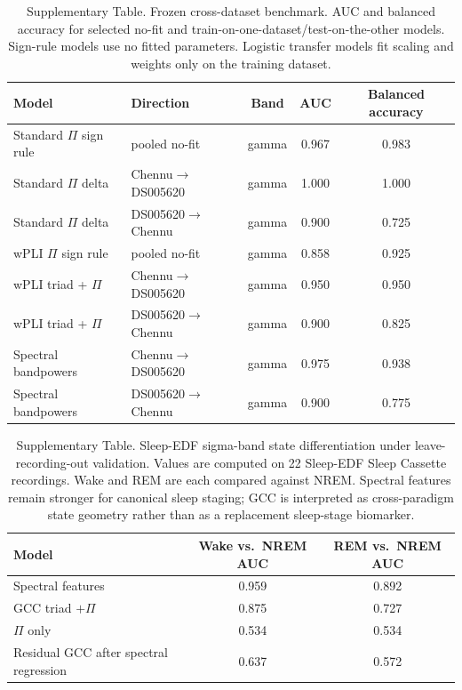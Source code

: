 \documentclass[11pt]{article}
\begin{document}
\begin{table}[h]
\centering
\caption{Supplementary Table. Frozen cross-dataset benchmark. AUC and balanced accuracy for selected no-fit and train-on-one-dataset/test-on-the-other models. Sign-rule models use no fitted parameters. Logistic transfer models fit scaling and weights only on the training dataset.}
\label{tab:frozen-transfer}
\small
\begin{tabular}{llccc}
\toprule
Model & Direction & Band & AUC & Balanced accuracy \\
\midrule
Standard $\Pi$ sign rule & pooled no-fit & gamma & 0.967 & 0.983 \\
Standard $\Pi$ delta & Chennu$\to$DS005620 & gamma & 1.000 & 1.000 \\
Standard $\Pi$ delta & DS005620$\to$Chennu & gamma & 0.900 & 0.725 \\
wPLI $\Pi$ sign rule & pooled no-fit & gamma & 0.858 & 0.925 \\
wPLI triad + $\Pi$ & Chennu$\to$DS005620 & gamma & 0.950 & 0.950 \\
wPLI triad + $\Pi$ & DS005620$\to$Chennu & gamma & 0.900 & 0.825 \\
Spectral bandpowers & Chennu$\to$DS005620 & gamma & 0.975 & 0.938 \\
Spectral bandpowers & DS005620$\to$Chennu & gamma & 0.900 & 0.775 \\
\bottomrule
\end{tabular}
\end{table}

\begin{table}[h]
\centering
\caption{Supplementary Table. Sleep-EDF sigma-band state differentiation under leave-recording-out validation. Values are computed on 22 Sleep-EDF Sleep Cassette recordings. Wake and REM are each compared against NREM. Spectral features remain stronger for canonical sleep staging; GCC is interpreted as cross-paradigm state geometry rather than as a replacement sleep-stage biomarker.}
\label{tab:sleep-edf}
\small
\begin{tabular}{lcc}
\toprule
Model & Wake vs.\ NREM AUC & REM vs.\ NREM AUC \\
\midrule
Spectral features & 0.959 & 0.892 \\
GCC triad $+\Pi$ & 0.875 & 0.727 \\
$\Pi$ only & 0.534 & 0.534 \\
Residual GCC after spectral regression & 0.637 & 0.572 \\
\bottomrule
\end{tabular}
\end{table}
\end{document}

